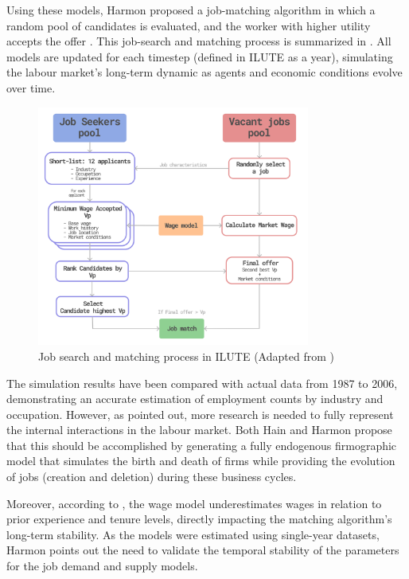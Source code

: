 Using these models, Harmon proposed a job-matching algorithm in which a random pool of candidates is evaluated, and the worker with higher utility accepts the offer \citep{HarmonMiller2018,HarmonMiller2020}. This job-search and matching process is summarized in . All models are updated for each timestep (defined in ILUTE as a year), simulating the labour market's long-term dynamic as agents and economic conditions evolve over time.

\begin{figure}[h]
    \centering
    \includegraphics[width=0.8\textwidth]{images/ch2_job_matching/job_matching.png}
    \caption{Job search and matching process in ILUTE (Adapted from \citet{Harmon2013})}
    \label{fig:job_matching}
\end{figure}

The simulation results have been compared with actual data from 1987 to 2006, demonstrating an accurate estimation of employment counts by industry and occupation. However, as \citet{Harmon2013} pointed out, more research is needed to fully represent the internal interactions in the labour market. Both Hain and Harmon propose that this should be accomplished by generating a fully endogenous firmographic model that simulates the birth and death of firms while providing the evolution of jobs (creation and deletion) during these business cycles. 

Moreover, according to \citet{Harmon2013}, the wage model underestimates wages in relation to prior experience and tenure levels, directly impacting the matching algorithm's long-term stability. As the models were estimated using single-year datasets, Harmon points out the need to validate the temporal stability of the parameters for the job demand and supply models. 

